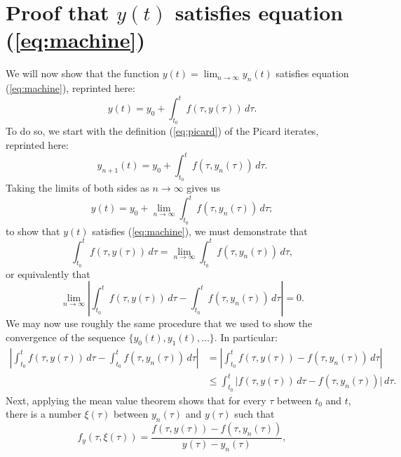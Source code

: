 \documentclass{myart}
\newcommand{\eq}[1]{(\ref{eq:#1})}
\begin{document}
\section{Proof that \texorpdfstring{$y(t)$}{y(t)} satisfies equation
  \eq{machine}}

We will now show that the function $y(t) = \lim_{n \to \infty} y_n(t)$
satisfies equation \eq{machine}, reprinted here:
\begin{equation*}
y(t) = y_0 + \int_{t_0}^t f(\tau, y(\tau)) \,d\tau.
\end{equation*}
To do so, we start with the definition \eq{picard} of the Picard
iterates, reprinted here:
\begin{equation*}
y_{n+1}(t) = y_0 + \int_{t_0}^t f(\tau, y_n(\tau)) \,d\tau.
\end{equation*}
Taking the limits of both sides as $n \to \infty$ gives us
\begin{equation*}
y(t) = y_0 + \lim_{n \to \infty}
               \int_{t_0}^t f(\tau, y_n(\tau)) \,d\tau;
\end{equation*}
to show that $y(t)$ satisfies \eq{machine}, we must demonstrate that
\begin{equation*}
  \int_{t_0}^t f(\tau, y(\tau)) \,d\tau
= \lim_{n \to \infty} \int_{t_0}^t f(\tau, y_n(\tau)) \,d\tau,
\end{equation*}
or equivalently that
\begin{equation*}
\lim_{n \to \infty} \left|\int_{t_0}^t f(\tau, y(\tau)) \,d\tau
  - \int_{t_0}^t f(\tau, y_n(\tau)) \,d\tau\right| = 0.
\end{equation*}
We may now use roughly the same procedure that we used to show the
convergence of the sequence $\{y_0(t), y_1(t), \ldots\}$. In
particular:
\begin{align*}
      \left|\int_{t_0}^t f(\tau, y(\tau)) \,d\tau
        - \int_{t_0}^t f(\tau, y_n(\tau)) \,d\tau\right|
&   = \left|\int_{t_0}^t f(\tau, y(\tau))
        - f(\tau, y_n(\tau)) \,d\tau\right| \\
&\leq \int_{t_0}^t \Big|f(\tau, y(\tau)) \,d\tau
        - f(\tau, y_n(\tau))\Big| \,d\tau.
\end{align*}
Next, applying the mean value theorem shows that for every $\tau$
between $t_0$ and $t$, there is a number $\xi(\tau)$ between
$y_n(\tau)$ and $y(\tau)$ such that
\begin{equation*}
f_y(\tau, \xi(\tau)) = \frac{f(\tau, y(\tau)) - f(\tau, y_n(\tau))}
                            {y(\tau) - y_n(\tau)},
\end{equation*}
\end{document}
